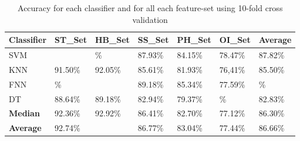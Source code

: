 \documentclass[journal,article,submit,moreauthors,pdftex]{Definitions/mdpi}
\begin{document}
\begin{table}[H]
	\caption{Accuracy for each classifier and for all each feature-set using 10-fold cross validation }
	\centering
	\begin{tabular}{p{2cm}p{1.7cm}p{1.7cm}p{1.7cm}p{1.7cm}p{1.7cm}p{1.7cm}}
		\toprule
		\textbf{Classifier} & \textbf{ST\_Set} & \textbf{HB\_Set} & \textbf{SS\_Set} & \textbf{PH\_Set} & \textbf{OI\_Set} & Average \\
		\midrule
		SVM &  \cellcolor{gray!35}{94.98\%} & \cellcolor{gray!35}{94.55}\% & 87.93\% &84.15\% & 78.47\% &87.82\%\\
		KNN & 91.50\% & 92.05\% & 85.61\% &81.93\% & 76,41\%& 85.50\% \\
		FNN & \cellcolor{gray!35}{95.31}\% & \cellcolor{gray!35}{95.89\%} & 89.18\% &85.34\% & 77.59\% & \cellcolor{gray!35}{89.04}\%\\
		DT & 88.64\% & 89.18\% &  82.94\% &79.37\% & \cellcolor{gray!35}{74.02}\% &82.83\%\\
		\bottomrule
		\textbf{Median} & 92.36\% &  92.92\% &86.41\% & 82.70\% & 77.12\%&86.30\%\\
		\midrule
		\textbf{Average} & 92.74\% &  \cellcolor{gray!35}{93.30\%}  & 86.77\% &83.04\% & 77.44\% &86.66\%\\
		\bottomrule
	\end{tabular}
	\label{accuracy_classifier_featureset}
\end{table}
\end{document}
